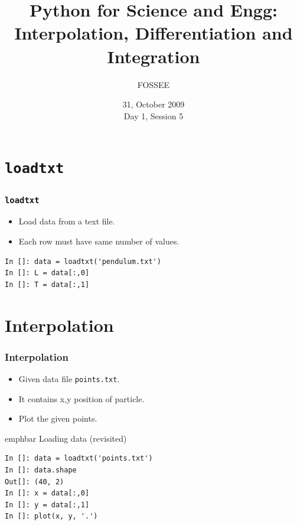 \documentclass[14pt,compress]{beamer}
\title[Calculus]{Python for Science and Engg: Interpolation, Differentiation and Integration}
\author[FOSSEE] {FOSSEE}
\institute[IIT Bombay] {Department of Aerospace Engineering\\IIT Bombay}
\date[] {31, October 2009\\Day 1, Session 5}
\newcommand{\emphbar}[1]
{\begin{beamercolorbox}[rounded=true]{emphbar} 
      {#1}
 \end{beamercolorbox}
}
\newcommand{\typ}[1]{\lstinline{#1}}
\begin{document}
\begin{frame}
  \titlepage
\end{frame}



\section{\typ{loadtxt}}

\begin{frame}[fragile]
  \frametitle{\typ{loadtxt}}
  \begin{itemize}
  \item Load data from a text file.
  \item Each row must have same number of values.
  \end{itemize}
\begin{lstlisting}
In []: data = loadtxt('pendulum.txt')
In []: L = data[:,0]
In []: T = data[:,1]
\end{lstlisting}
\end{frame}


\section{Interpolation}
\begin{frame}[fragile]
\frametitle{Interpolation}
\begin{itemize}
  \item Given data file \typ{points.txt}.
  \item It contains x,y position of particle.
  \item Plot the given points.
\end{itemize}
\emphbar{Loading data (revisited)}
\begin{lstlisting}
In []: data = loadtxt('points.txt')
In []: data.shape
Out[]: (40, 2)
In []: x = data[:,0]
In []: y = data[:,1]
In []: plot(x, y, '.')
\end{lstlisting}
\end{frame}
\end{document}
